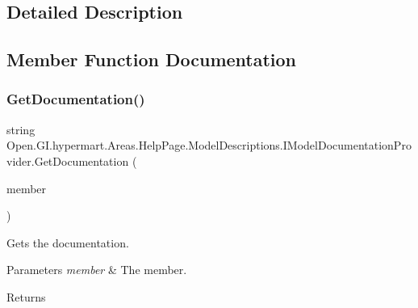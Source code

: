 \subsection{Detailed Description}




\subsection{Member Function Documentation}
\hypertarget{interface_open_1_1_g_i_1_1hypermart_1_1_areas_1_1_help_page_1_1_model_descriptions_1_1_i_model_documentation_provider_a27d4470da05e52051ae345515c17755a}{}\label{interface_open_1_1_g_i_1_1hypermart_1_1_areas_1_1_help_page_1_1_model_descriptions_1_1_i_model_documentation_provider_a27d4470da05e52051ae345515c17755a} 
\subsubsection{\texorpdfstring{Get\+Documentation()}{GetDocumentation()}\hspace{0.1cm}{\footnotesize\ttfamily [1/2]}}
{\footnotesize\ttfamily string Open.\+G\+I.\+hypermart.\+Areas.\+Help\+Page.\+Model\+Descriptions.\+I\+Model\+Documentation\+Provider.\+Get\+Documentation (\begin{DoxyParamCaption}\item[{Member\+Info}]{member }\end{DoxyParamCaption})}



Gets the documentation. 


\begin{DoxyParams}{Parameters}
{\em member} & The member.\\
\hline
\end{DoxyParams}
\begin{DoxyReturn}{Returns}

\end{DoxyReturn}


